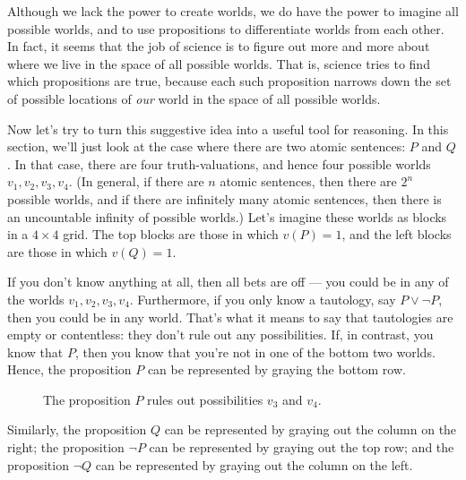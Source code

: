 Although we lack the power to create worlds, we do have the power to
imagine all possible worlds, and to use propositions to differentiate
worlds from each other.  In fact, it seems that the job of science is
to figure out more and more about where we live in the space of all
possible worlds.  That is, science tries to find which propositions
are true, because each such proposition narrows down the set of
possible locations of {\it our} world in the space of all possible
worlds.

Now let's try to turn this suggestive idea into a useful tool for
reasoning.  In this section, we'll just look at the case where there
are two atomic sentences: $P$ and $Q$.  In that case, there are four
truth-valuations, and hence four possible worlds $v_1,v_2,v_3,v_4$.
(In general, if there are $n$ atomic sentences, then there are $2^n$
possible worlds, and if there are infinitely many atomic sentences,
then there is an uncountable infinity of possible worlds.)  Let's
imagine these worlds as blocks in a $4\times 4$ grid.  The top blocks
are those in which $v(P)=1$, and the left blocks are those in which
$v(Q)=1$.
\begin{figure}[h]
\end{figure}

If you don't know anything at all, then all bets are off --- you could
be in any of the worlds $v_1,v_2,v_3,v_4$.  Furthermore, if you only
know a tautology, say $P\vee\neg P$, then you could be in any world.
That's what it means to say that tautologies are empty or contentless:
they don't rule out any possibilities.  If, in contrast, you know that
$P$, then you know that you're not in one of the bottom two worlds.
Hence, the proposition $P$ can be represented by graying the bottom
row.
\begin{figure}[h]
  \caption{The proposition $P$ rules out possibilities $v_3$ and $v_4$.}
\end{figure}
Similarly, the proposition $Q$ can be represented by graying out the
column on the right; the proposition $\neg P$ can be represented by
graying out the top row; and the proposition $\neg Q$ can be
represented by graying out the column on the left.

